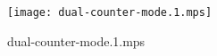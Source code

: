 \documentclass[letterpaper,10pt]{article}
\begin{document}
\begin{figure}
    \centering
    \texttt{[image: dual-counter-mode.1.mps]}
    \caption{dual-counter-mode.1.mps}
\end{figure}
\end{document}
